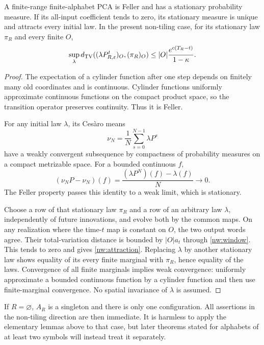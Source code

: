 \begin{lemma}\label{nw:ergodic}
A finite-range finite-alphabet PCA is Feller and has a stationary probability measure. If its all-input coefficient tends to zero, its stationary measure is unique and attracts every initial law. In the present non-tiling case, for its stationary law $\pi_R$ and every finite $O$,
\begin{equation}\label{nw:attraction}
 \sup_{\lambda}d_{\mathrm{TV}}((\lambda P_{R,\varepsilon}^t)_O,(\pi_R)_O)
 \le |O|\frac{e^{c(T_R-t)}}{1-\kappa}.
\end{equation}
\end{lemma}
\begin{proof}
The expectation of a cylinder function after one step depends on finitely many old coordinates and is continuous. Cylinder functions uniformly approximate continuous functions on the compact product space, so the transition operator preserves continuity. Thus it is Feller.

For any initial law $\lambda$, its Ces\`aro means
\[
 \nu_N=\frac1N\sum_{s=0}^{N-1}\lambda P^s
\]
have a weakly convergent subsequence by compactness of probability measures on a compact metrizable space. For a bounded continuous $f$,
\[
 (\nu_NP-\nu_N)(f)=\frac{(\lambda P^N)(f)-\lambda(f)}N
 \longrightarrow0.
\]
The Feller property passes this identity to a weak limit, which is stationary.

Choose a row of that stationary law $\pi_R$ and a row of an arbitrary law $\lambda$, independently of future innovations, and evolve both by the common maps. On any realization where the time-$t$ map is constant on $O$, the two output words agree. Their total-variation distance is bounded by $|O|a_t$ through \eqref{nw:window}. This tends to zero and gives \eqref{nw:attraction}. Replacing $\lambda$ by another stationary law shows equality of its every finite marginal with $\pi_R$, hence equality of the laws. Convergence of all finite marginals implies weak convergence: uniformly approximate a bounded continuous function by a cylinder function and then use finite-marginal convergence. No spatial invariance of $\lambda$ is assumed.
\end{proof}

If $R=\varnothing$, $A_R$ is a singleton and there is only one configuration. All assertions in the non-tiling direction are then immediate. It is harmless to apply the elementary lemmas above to that case, but later theorems stated for alphabets of at least two symbols will instead treat it separately.

